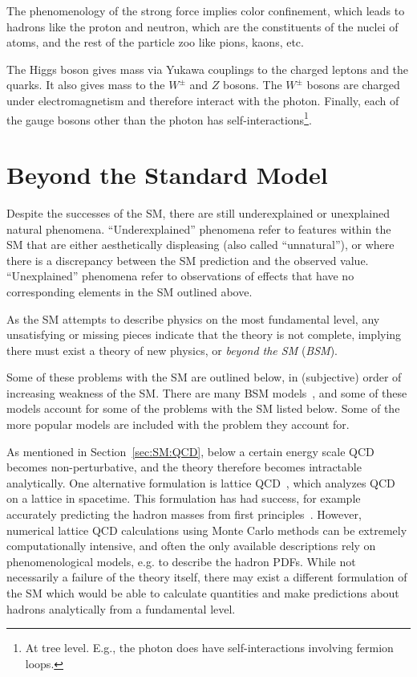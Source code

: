 The phenomenology of the strong force implies color confinement, which leads to hadrons like the proton and neutron, which are the constituents of the nuclei of atoms, and the rest of the particle zoo like pions, kaons, etc.

The Higgs boson gives mass via Yukawa couplings to the charged leptons and the quarks.
It also gives mass to the $W^\pm$ and $Z$ bosons.
The $W^\pm$ bosons are charged under electromagnetism and therefore interact with the photon.
Finally, each of the gauge bosons other than the photon has self-interactions\footnote{At tree level. E.g., the photon does have self-interactions involving fermion loops.}.

\section{Beyond the Standard Model}
\label{sec:SM:BSM}
Despite the successes of the SM, there are still underexplained or unexplained natural phenomena.
``Underexplained'' phenomena refer to features within the SM that are either aesthetically displeasing (also called ``unnatural''), or where there is a discrepancy between the SM prediction and the observed value.
``Unexplained'' phenomena refer to observations of effects that have no corresponding elements in the SM outlined above.

As the SM attempts to describe physics on the most fundamental level, any unsatisfying or missing pieces indicate that the theory is not complete, implying there must exist a theory of new physics, or \textit{beyond the SM} (\textit{BSM}).

Some of these problems with the SM are outlined below, in (subjective) order of increasing weakness of the SM.
There are many BSM models~\cite{Lykken:2010mc,Lee:2019zbu,Ellis:2009pz,Ellis:2012zz,Virdee:2016,Halkiadakis:2014qda}, and some of these models account for some of the problems with the SM listed below.
Some of the more popular models are included with the problem they account for.

As mentioned in Section~\ref{sec:SM:QCD}, below a certain energy scale QCD becomes non-perturbative, and the theory therefore becomes intractable analytically.
One alternative formulation is lattice QCD~\cite{Gupta:1997nd}, which analyzes QCD on a lattice in spacetime.
This formulation has had success, for example accurately predicting the hadron masses from first principles~\cite{Durr:2008zz}.
However, numerical lattice QCD calculations using Monte Carlo methods can be extremely computationally intensive, and often the only available descriptions rely on phenomenological models, e.g. to describe the hadron PDFs.
While not necessarily a failure of the theory itself, there may exist a different formulation of the SM which would be able to calculate quantities and make predictions about hadrons analytically from a fundamental level.

